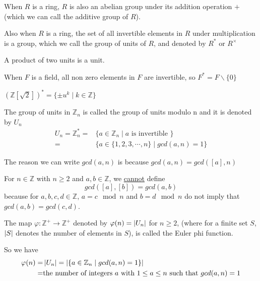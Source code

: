 \begin{exmp}
When $R$ is a ring, $R$ is also an abelian group under its addition operation $+$ (which we can call the additive group of $R$).
\end{exmp}

\begin{exmp}
Also when $R$ is a ring, the set of all invertible elements in $R$ under multiplication is a group, which we call the group of units of $R$, and denoted by $R^{\ast}$ or $R^{\times}$
\end{exmp}

\begin{rem}
A product of two units is a unit.
\end{rem}

\begin{exmp}
When $F$ is a field, all non zero elements in $F$ are invertible, so $F^{\ast} = F \backslash \{0\}$
\end{exmp}

\begin{exmp}
$(\mathbb{Z} [\sqrt{2}])^{\ast} = \{\pm u^k\mid k\in\mathbb{Z}\}$
\end{exmp}

\begin{defn}
The group of units in $\mathbb{Z}_n$ is called the group of units modulo n and it is denoted by $U_n$
\begin{align*}
    U_n = \mathbb{Z}_n^{\ast} =& \{a\in\mathbb{Z}_n \mid a \text{ is invertible }\} \\
    = & \{a\in\{1,2,3,\cdots,n\} \mid gcd(a,n) = 1\}
\end{align*}

\end{defn}

\begin{rem}
The reason we can write $gcd(a,n)$ is because $gcd(a,n) = gcd([a],n)$
\end{rem}

\begin{rem}
For $n\in\mathbb{Z}$ with $n\geq 2$ and $a,b\in\mathbb{Z}$, we \underline{cannot} define \[gcd([a],[b]) = gcd(a,b)\] because for $a,b,c,d\in\mathbb{Z}$, $a = c \mod n$ and $b = d \mod n$ do not imply that $gcd(a,b) = gcd(c,d)$.
\end{rem}

\begin{defn}
The map $\varphi \colon \mathbb{Z}^+\to\mathbb{Z}^+$ denoted by $\varphi (n) = \left| U_n \right|$ for $n\geq 2$, (where for a finite set $S$, $\left| S \right|$ denotes the number of elements in $S$), is called the Euler phi function.

So we have 
\begin{align*}
    \varphi (n) = & \left| U_n \right| = \left| \{a\in\mathbb{Z}_n\mid gcd(a,n) = 1\} \right| \\
    = & \text{the number of integers }a \text{ with } 1\leq a \leq n \text{ such that } gcd(a,n) = 1
\end{align*}
\end{defn}

